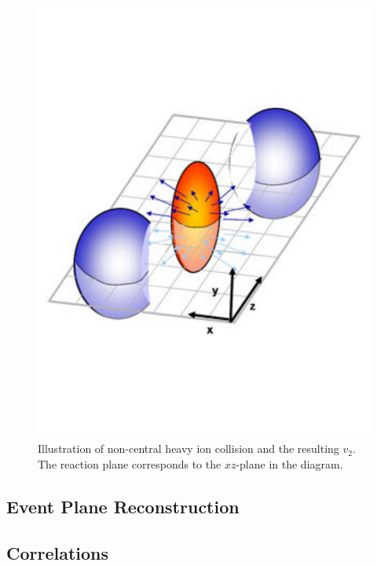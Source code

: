 \begin{figure}[htbp]
\begin{center}
\includegraphics[scale=.4]{Plots/Correlations/v2_cartoon_2.pdf}
\end{center}
\caption[$v_2$ and Event Plane Diagram]{Illustration of non-central heavy ion collision and the resulting $v_2$. The reaction plane corresponds to the $xz$-plane in the diagram.}
\label{fig:EPcartoon}
\end{figure}

\subsection{Event Plane Reconstruction}

\subsection{Correlations}

